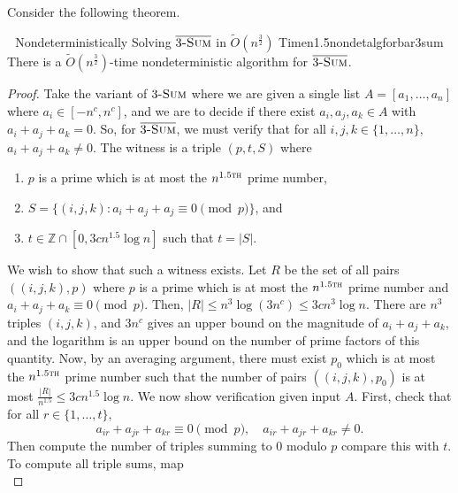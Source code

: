         \pagebreak

        Consider the following theorem.
        \begin{theorem}{\Stop\,\,\cite{carmosino2016nseth} Nondeterministically Solving \(\bar{3\textsc{-Sum}}\) in \(\tilde{O}(n^{\frac{3}{2}})\) Time}{n1.5nondetalgforbar3sum}
            There is a \(\tilde{O}\left(n^{\frac{3}{2}}\right)\)-time nondeterministic algorithm for \(\bar{3\textsc{-Sum}}\).
            \begin{proof}
                Take the variant of \(3\textsc{-Sum}\) where we are given a single list \(A=[a_1,\ldots,a_n]\) where \(a_i\in[-n^c,n^c]\), and we are to decide if there exist \(a_i,a_j,a_k\in A\) with \(a_i+a_j+a_k=0\). So, for \(\bar{3\textsc{-Sum}}\), we must verify that for all \(i,j,k\in\{1,\ldots,n\}\), \(a_i+a_j+a_k\neq0\). The witness is a triple \((p,t,S)\) where 
                \begin{enumerate}
                    \item \(p\) is a prime which is at most the \(n^{1.5\textsc{th}}\) prime number,
                    \item \(S=\{(i,j,k):a_i+a_j+a_j\equiv0\pmod{p}\}\), and
                    \item \(t\in\mathbb{Z}\cap[0,3cn^{1.5}\log n]\) such that \(t=|S|\).
                \end{enumerate}
                We wish to show that such a witness exists. Let \(R\) be the set of all pairs \(((i,j,k),p)\) where \(p\) is a prime which is at most the \(n^{1.5\textsc{th}}\) prime number and \(a_i+a_j+a_k\equiv0\pmod{p}\). Then, \(|R|\leq n^3\log(3n^c)\leq 3cn^3\log n\). There are \(n^3\) triples \((i,j,k)\), and \(3n^c\) gives an upper bound on the magnitude of \(a_i+a_j+a_k\), and the logarithm is an upper bound on the number of prime factors of this quantity. Now, by an averaging argument, there must exist \(p_0\) which is at most the \(n^{1.5\textsc{th}}\) prime number such that the number of pairs \(((i,j,k),p_0)\) is at most \(\frac{|R|}{n^{1.5}}\leq 3cn^{1.5}\log n\). We now show verification given input \(A\). First, check that for all \(r\in\{1,\ldots,t\}\),
                \begin{equation*}
                    a_{ir}+a_{jr}+a_{kr}\equiv0\pmod{p},\quad a_{ir}+a_{jr}+a_{kr}\neq0.
                \end{equation*}
                Then compute the number of triples summing to \(0\) modulo \(p\) compare this with \(t\). To compute all triple sums, map
                \begin{equation*}

\end{equation*}
\end{proof}
\end{theorem}
